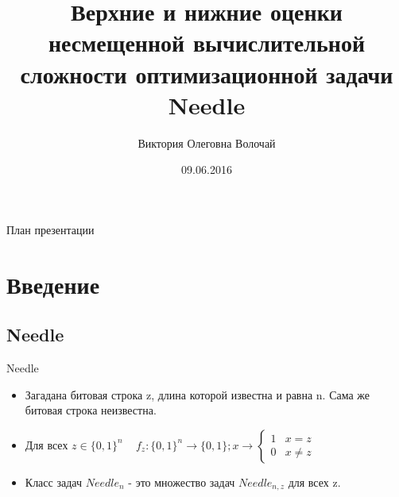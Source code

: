 \documentclass{beamer}
\begin{document}
\title[Оценки задачи Needle]{Верхние и нижние оценки несмещенной вычислительной сложности
оптимизационной задачи Needle}

\author[Волочай В.О.] {Виктория Олеговна Волочай}


\date{09.06.2016}

\subject{Theoretical Computer Science}

\begin{frame}
  \titlepage
\end{frame}

 \begin{frame}{План презентации}
  \tableofcontents
 \end{frame}

 \section{Введение}
 
 \subsection{Needle}
 \begin{frame}{Needle}
  \begin{itemize}
   \item Загадана битовая строка z, длина которой известна и равна n. Сама же битовая строка неизвестна.
   \item  Для всех $z \in \{0, 1\}^n \;\;\; $  
    \begin{math} 
    f_{z} : \{0, 1 \}^n \rightarrow \{0,1\}; x \rightarrow  \left\{ \begin{array}{ll}
    1 & \textrm{$x = z$}\\
    0 & \textrm{$x \ne z$}
    \end{array} \right.
    \end{math}

   \item Класс задач $Needle_n$ - это множество задач $Needle_{n, z}$ для всех z.
   \end{itemize} 
 \end{frame}
\end{document}
